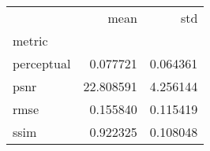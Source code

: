 \begin{tabular}{lrr}
\toprule
{} &       mean &       std \\
metric     &            &           \\
\midrule
perceptual &   0.077721 &  0.064361 \\
psnr       &  22.808591 &  4.256144 \\
rmse       &   0.155840 &  0.115419 \\
ssim       &   0.922325 &  0.108048 \\
\bottomrule
\end{tabular}
